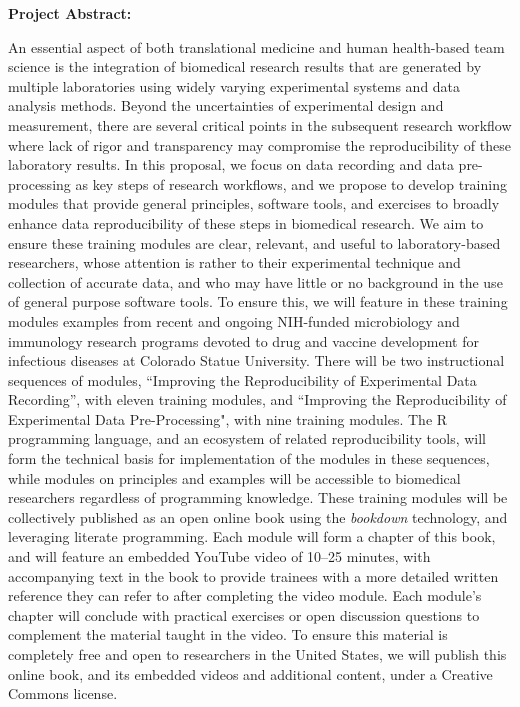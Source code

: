 \documentclass[pdftex,english,11.5pt,parskip=half]{scrartcl}
\begin{document}
\def\bf{\normalfont\bfseries}
\pagestyle{empty}

{\large \textbf{Project Abstract:}}


An essential aspect of both translational medicine and human 
health-based team science is the integration of biomedical research 
results that are generated by multiple laboratories using widely varying 
experimental systems and data analysis methods. Beyond the uncertainties of 
experimental design and measurement, there are several critical points in 
the subsequent research workflow where lack of rigor and transparency 
may compromise the reproducibility of these laboratory results.  In this proposal, 
we focus on data recording and data pre-processing as key steps 
of research workflows, and we propose to develop training modules that 
provide general principles, software tools, and exercises to broadly 
enhance data reproducibility of these steps in biomedical research. We aim to
ensure these training modules are clear, relevant, and useful to laboratory-based 
researchers, whose attention is rather to their experimental technique and collection 
of accurate data, and who may have little or no background in the use of general 
purpose software tools.  To ensure this, we will feature in these training modules 
examples from recent and ongoing NIH-funded microbiology and immunology research 
programs devoted to drug and vaccine development for infectious diseases at 
Colorado Statue University. 
There will be two instructional sequences of modules, ``Improving the Reproducibility of Experimental Data Recording'', with eleven training modules, 
and ``Improving the Reproducibility of Experimental Data Pre-Processing", with nine training modules.
The R programming language, and an ecosystem of
related reproducibility tools, will form the technical basis for implementation
of the modules in these sequences, while modules on principles and examples will be accessible to biomedical researchers regardless of programming knowledge.  
These training modules will be collectively
published as an open online book using the \textit{bookdown} technology, and leveraging literate 
programming. Each
module will form a chapter of this book, and will feature an embedded YouTube
video of 10--25 minutes, with accompanying text in the book to provide trainees
with a more detailed written reference they can refer to after completing the
video module.  Each module's chapter will conclude with practical exercises or
open discussion questions to complement the material taught in the video. 
To
ensure this material is completely free and open to researchers in the United
States, we will publish this online book, and its embedded videos and additional content, under a Creative Commons
license.
\end{document}
